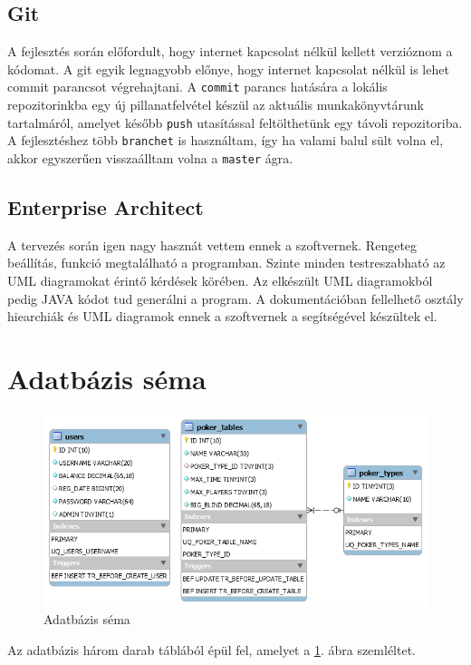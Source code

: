 \subsection{Git}
A fejlesztés során előfordult, hogy internet kapcsolat nélkül kellett verzióznom a kódomat. A git egyik legnagyobb előnye, hogy internet kapcsolat nélkül is lehet commit parancsot végrehajtani. A \texttt{commit} parancs hatására a lokális repozitorinkba egy új pillanatfelvétel készül az aktuális munkakönyvtárunk tartalmáról, amelyet később \texttt{push} utasítással feltölthetünk egy távoli repozitoriba. A fejlesztéshez több \texttt{branchet} is használtam, így ha valami balul sült volna el, akkor egyszerűen visszaálltam volna a \texttt{master} ágra.

\subsection{Enterprise Architect}
A tervezés során igen nagy hasznát vettem ennek a szoftvernek. Rengeteg beállítás, funkció megtalálható a programban. Szinte minden testreszabható az UML diagramokat érintő kérdések körében. Az elkészült UML diagramokból pedig JAVA kódot tud generálni a program. A dokumentációban fellelhető osztály hiearchiák és UML diagramok ennek a szoftvernek a segítségével készültek el.

\section{Adatbázis séma} \label{sec:db-schema}
\begin{figure}[h!]
  \caption{Adatbázis séma}
  \label{fig:db_scheme}
  \centering
    \includegraphics[width=\textwidth]{user-documentation/images/db_scheme2.png}
\end{figure}
Az adatbázis három darab táblából épül fel, amelyet a \ref{fig:db_scheme}. ábra szemléltet.

